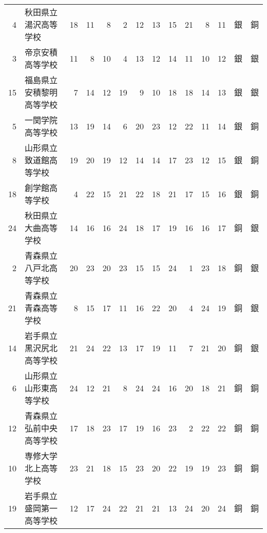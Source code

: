 \documentclass[11pt,a4paper,landscape,twoside,openany,english,uplatex]{jsarticle}
\begin{document}
\begin{table}[h]
{\begin{tabular}{r|l|rrrrrrrrr|r|c|c}
   4 & 秋田県立湯沢高等学校         &     18  &    11  &     8  &     2 &     12  &    13  &    15  &    21 &      8 & 11 & 銀 &  銅\\
   3 & 帝京安積高等学校             &   11    &   8    &  10    &   4   &   13    &  12    &  14    &  11   &   10   & 12 & 銀 &  銀\\
  15 & 福島県立安積黎明高等学校     &    7    &  14    &  12    &  19   &    9    &  10    &  18    &  18   &   14   & 13 & 銀 &  銀\\
   5 & 一関学院高等学校             &   13    &  19    &  14    &   6   &   20    &  23    &  12    &  22   &   11   & 14 & 銀 &  銅\\
   8 & 山形県立致道館高等学校       &    19   &   20   &   19   &   12  &    14   &   14   &   17   &   23  &    12  & 15 & 銀 &  銅\\
  18 & 創学館高等学校               &     4   &   22   &   15   &   21  &    22   &   18   &   21   &   17  &    15  & 16 & 銀 &  銅\\
  \hline
  24 & 秋田県立大曲高等学校         &     14  &    16  &    16  &    24 &     18  &    17  &    19  &    16 &     16 & 17 & 銅 &  銀\\
   2 & 青森県立八戸北高等学校       &    20   &   23   &   20   &   23  &    15   &   15   &   24   &    1  &    23  & 18 & 銅 &  銀\\
  21 & 青森県立青森高等学校         &      8  &    15  &    17  &    11 &     16  &    22  &    20  &     4 &     24 & 19 & 銅 &  銀\\
  14 & 岩手県立黒沢尻北高等学校     &   21    &  24    &  22    &  13   &   17    &  19    &  11    &   7   &   21   & 20 & 銅 &  銀\\
   6 & 山形県立山形東高等学校       &    24   &   12   &   21   &    8  &    24   &   24   &   16   &   20  &    18  & 21 & 銅 &  銅\\
  12 & 青森県立弘前中央高等学校     &   17    &  18    &  23    &  17   &   19    &  16    &  23    &   2   &   22   & 22 & 銅 &  銅\\
  10 & 専修大学北上高等学校         &   23    &  21    &  18    &  15   &   23    &  20    &  22    &  19   &   19   & 23 & 銅 &  銅\\
  19 & 岩手県立盛岡第一高等学校     &   12    &  17    &  24    &  22   &   21    &  21    &  13    &  24   &   20   & 24 & 銅 &  銅\\
  \hline
 \end{tabular}
 }
\end{table}
\end{document}
